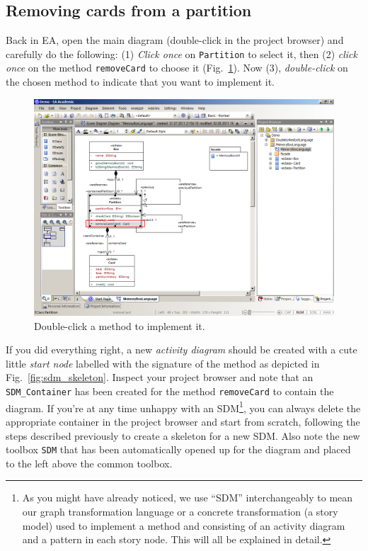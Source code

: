 \subsection{Removing cards from a partition}

Back in EA, open the main diagram (double-click in the project browser) and
carefully do the following: (1) \emph{Click once} on \texttt{Partition} to
select it, then (2) \emph{click once} on the method \texttt{removeCard} to
choose it (Fig.~\ref{fig:sdm_start}). 
Now (3), \emph{double-click} on the chosen
method to indicate that you want to implement it.

\begin{figure}[htp]
\begin{center}
  \includegraphics[width=\textwidth]{pics/sdmBilder/removeCard/sdm01RAW}
  \caption{Double-click a method to implement it.}  
  \label{fig:sdm_start}
\end{center}
\end{figure}
 
If you did everything right, a new \emph{activity diagram} should be created
with a cute little \emph{start node} labelled with the signature of the method
as depicted in Fig.~\ref{fig:sdm_skeleton}.  Inspect your project browser and
note that an \texttt{SDM\_Container} has been created for the method
\texttt{removeCard} to contain the diagram.  If you're at any time unhappy with
an SDM\footnote{As you might have already noticed, we use ``SDM''
interchangeably to mean our graph transformation language or a concrete
transformation (a story model) used to implement a method and consisting of
an activity diagram and a pattern in each story node.  This will all be
explained in detail.}, you can always delete the appropriate
container in the project browser and start from scratch, following the steps
described previously to create a skeleton for a new SDM.  Also note the new
toolbox \texttt{SDM} that has been automatically opened up for the diagram
and placed to the left above the common toolbox. 

